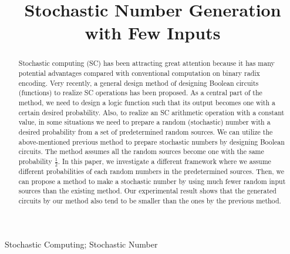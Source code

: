 \documentclass[10pt,conference]{IEEEtran}
\begin{document}
\title{Stochastic Number Generation with Few Inputs}

\author{
\and
{}
}

\maketitle

\begin{abstract}
Stochastic computing (SC) has been attracting great
attention because it has many potential advantages compared
with conventional computation on binary radix encoding. Very
recently, a general design method of designing Boolean circuits
(functions) to realize SC operations has been proposed. As a
central part of the method, we need to design a logic function such
that its output becomes one with a certain desired probability.
Also, to realize an SC arithmetic operation with a constant value,
in some situations we need to prepare a random (stochastic)
number with a desired probability from a set of predetermined
random sources. We can utilize the above-mentioned previous
method to prepare stochastic numbers by designing Boolean
circuits. The method assumes all the random sources become
one with the same probability $\frac{1}{2}$. In this paper, we investigate
a different framework where we assume different probabilities
of each random numbers in the predetermined sources. Then,
we can propose a method to make a stochastic number by using
much fewer random input sources than the existing method.
Our experimental result shows that the generated circuits by our
method also tend to be smaller than the ones by the previous
method.

\end{abstract}
\begin{IEEEkeywords} 
Stochastic Computing; Stochastic Number
\end{IEEEkeywords}
\end{document}
